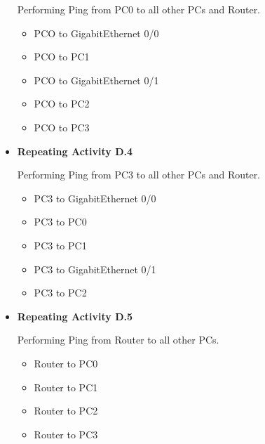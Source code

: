 \documentclass[12pt]{article}
\begin{document}
\begin{itemize}
            Performing Ping from PC0 to all other PCs and Router.
            \begin{itemize}
                  \item PCO to GigabitEthernet 0/0
                  \item PCO to PC1
                  \item PCO to GigabitEthernet 0/1
                  \item PCO to PC2
                  \item PCO to PC3
            \end{itemize}

      \item \textbf{Repeating Activity D.4}

            Performing Ping from PC3 to all other PCs and Router.
            \begin{itemize}
                  \item PC3 to GigabitEthernet 0/0
                  \item PC3 to PC0
                  \item PC3 to PC1
                  \item PC3 to GigabitEthernet 0/1
                  \item PC3 to PC2
            \end{itemize}


      \item \textbf{Repeating Activity D.5}

            Performing Ping from Router to all other PCs.
            \begin{itemize}
                  \item Router to PC0
                  \item Router to PC1
                  \item Router to PC2
                  \item Router to PC3
            \end{itemize}
\end{itemize}
\end{document}
